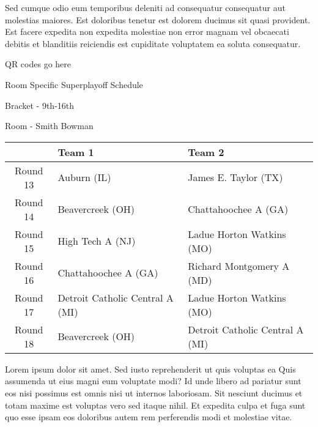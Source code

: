 \documentclass{article}%
\begin{document}
\newline%
Sed cumque odio eum temporibus deleniti ad consequatur consequatur aut molestias maiores. Est doloribus tenetur est dolorem ducimus sit quasi provident. Est facere expedita non expedita molestiae non error magnam vel obcaecati debitis et blanditiis reiciendis est cupiditate voluptatem ea soluta consequatur.%
\vspace*{140pt}%
\begin{center}%
\begin{Huge}%
QR codes go here%
\end{Huge}%
\end{center}%
\newpage%
\begin{center}%
\begin{Huge}%
Room Specific Superplayoff Schedule%
\end{Huge}%
\vspace*{8pt}%
\linebreak%
\begin{Large}%
Bracket {-} 9th{-}16th%
\end{Large}%
\vspace*{8pt}%
\linebreak%
\vspace*{8pt}%
\begin{Large}%
Room {-} Smith Bowman%
\end{Large}%
\end{center}%
%
\begin{tabularx}{\textwidth}{|c|Y|Y|}%
\hline%
&Team 1&Team 2\\%
\hline%
Round 13&Auburn (IL)&James E. Taylor (TX)\\%
Round 14&Beavercreek (OH)&Chattahoochee A (GA)\\%
Round 15&High Tech A (NJ)&Ladue Horton Watkins (MO)\\%
Round 16&Chattahoochee A (GA)&Richard Montgomery A (MD)\\%
Round 17&Detroit Catholic Central A (MI)&Ladue Horton Watkins (MO)\\%
Round 18&Beavercreek (OH)&Detroit Catholic Central A (MI)\\%
\hline%
\end{tabularx}%
\vspace*{8pt}%
\newline%
Lorem ipsum dolor sit amet. Sed iusto reprehenderit ut quis voluptas ea Quis assumenda ut eius magni eum voluptate modi? Id unde libero ad pariatur sunt eos nisi possimus est omnis nisi ut internos laboriosam. Sit nesciunt ducimus et totam maxime est voluptas vero sed itaque nihil. Et expedita culpa et fuga sunt quo esse ipsam eos doloribus autem rem perferendis modi et molestiae vitae.\newline%
\end{document}
